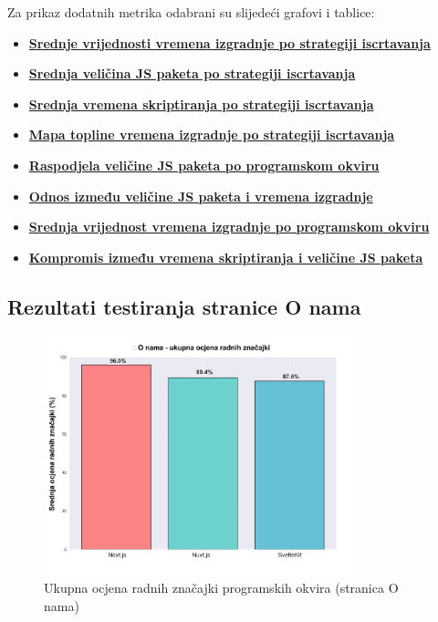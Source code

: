 \bigskip
\noindent
Za prikaz dodatnih metrika odabrani su slijedeći grafovi i tablice:

\begin{itemize}
    \item \hyperref[fig:average_build_times_by_framework_and_strategy]{\textbf{Srednje vrijednosti vremena izgradnje po strategiji iscrtavanja}}
    \item \hyperref[fig:average_bundle_size_by_strategy]{\textbf{Srednja veličina JS paketa po strategiji iscrtavanja}}
    \item \hyperref[fig:average_scripting_performance_times]{\textbf{Srednja vremena skriptiranja po strategiji iscrtavanja}}
    \item \hyperref[fig:build_times_heat_map]{\textbf{Mapa topline vremena izgradnje po strategiji iscrtavanja}}
    \item \hyperref[fig:bundle_size_distribution_by_framework]{\textbf{Raspodjela veličine JS paketa po programskom okviru}}
    \item \hyperref[fig:bundle_size_vs_build_time_correlation]{\textbf{Odnos između veličine JS paketa i vremena izgradnje}}
    \item \hyperref[fig:overall_framework_build_performance]{\textbf{Srednja vrijednost vremena izgradnje po programskom okviru}}
    \item \hyperref[fig:performance_vs_bundle_size_tradeoff]{\textbf{Kompromis između vremena skriptiranja i veličine JS paketa}}
\end{itemize}

\subsection{Rezultati testiranja stranice O nama}
\label{sec:rezultati-o-nama}

\begin{figure}[H]
    \centering
    \includegraphics[width=0.8\textwidth]{slike/rezultati/about/about_framework_overall_performance.png}
    \caption{Ukupna ocjena radnih značajki programskih okvira (stranica O nama)}
    \label{fig:testiranje-o-nama-ukupne-performanse}
\end{figure}

